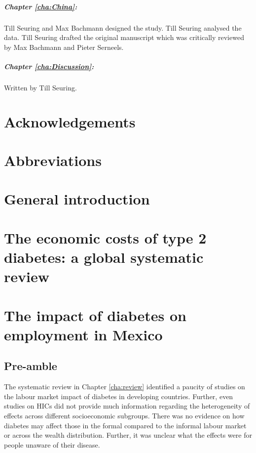\paragraph{Chapter \ref{cha:China}:} Till Seuring and Max Bachmann designed the study. Till Seuring analysed the data. Till Seuring drafted the original manuscript which was critically reviewed by Max Bachmann and Pieter Serneels.

\paragraph{Chapter \ref{cha:Discussion}:} Written by Till Seuring.
\cleardoublepage

\chapter*{\label{acknowledgements}Acknowledgements}

\cleardoublepage
{}
\chapter*{\label{abbreviations}Abbreviations}


\acresetall  %



\chapter{\label{cha:intro}General introduction}

\acresetall  %
\chapter{\label{cha:review}The economic costs of type 2 diabetes: a global systematic review}

\acresetall  %
\chapter{\label{cha:Mex1}The impact of diabetes on employment in Mexico}
\section*{Pre-amble}

The systematic review in Chapter \ref{cha:review} identified a paucity of studies on the labour market impact of diabetes in developing countries. Further, even studies on \acp{HIC} did not provide much information regarding the heterogeneity of effects across different socioeconomic subgroups. There was no evidence on how diabetes may affect those in the formal compared to the informal labour market or across the wealth distribution. Further, it was unclear what the effects were for people unaware of their disease.

